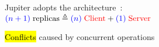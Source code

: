
\begin{frame}{}
  \centerline{\Huge {}}
\end{frame}

\begin{frame}{}
  \begin{center}
    {\large Jupiter adopts the  architecture~:} \\[3pt] \pause
    {\large $\textcolor{blue}{(n+1)}\; \text{replicas} \triangleq \textcolor{blue}{(n)}\; \text{\textcolor{red}{Client}} + \textcolor{blue}{(1)}\; \text{\textcolor{red}{Server}}$}
  \end{center}

  \begin{center}
    \begin{minipage}{0.50\textwidth}
      
    \end{minipage}
  \end{center}

  \vspace{-1.00cm}
\end{frame}

\begin{frame}{}
  \begin{center}
    {\large {} \hl{Conflicts} caused by concurrent operations} \\[12pt] \pause
  \end{center}

\end{frame}

% 

